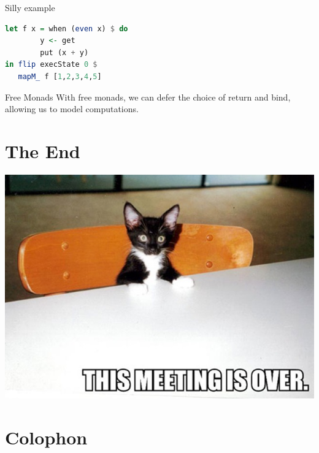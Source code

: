 \documentclass[utf8x,notes,17pt]{beamer}
\begin{document}
\begin{frame}[fragile,label=sec-16-30]{Silly example}
\begin{example}[\vspace*{-3.5ex}]
\begin{lstlisting}[language=Haskell]
let f x = when (even x) $ do
        y <- get
        put (x + y)
in flip execState 0 $
   mapM_ f [1,2,3,4,5]
\end{lstlisting}
\end{example}
\end{frame}
\begin{frame}[fragile,label=sec-16-31]{Free Monads}
With free monads, we can defer the choice of return and bind, allowing us to
model computations.
\end{frame}
\section{The End}
\label{sec-17}
\begin{center}
\includegraphics[width=\linewidth]{images/this-meeting-is-over_3.jpg}
\end{center}
\section{Colophon}
\label{sec-18}
\end{document}
